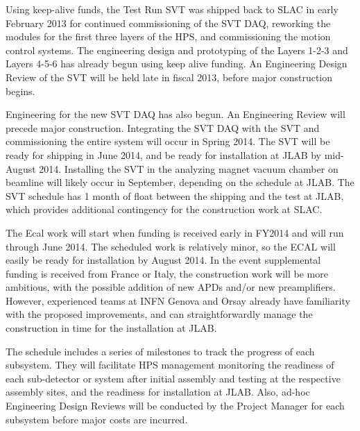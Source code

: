 Using keep-alive funds, the Test Run SVT was shipped back to SLAC in early February 2013 for continued commissioning of the SVT DAQ, reworking the 
modules for the first three layers of the HPS, and commissioning the motion control systems. The engineering design and prototyping of the Layers 1-2-3 and 
Layers 4-5-6 has already begun using keep alive funding. An Engineering Design Review of the SVT will be held late in fiscal 2013, before major construction
begins. 

Engineering for the new SVT DAQ has also begun. An Engineering Review will precede major construction.  Integrating the SVT DAQ with the SVT and commissioning the
entire system will occur in Spring 2014. The SVT will be ready for shipping in June 2014, and be ready for installation at JLAB by mid-August 2014.  Installing 
the SVT in the analyzing magnet vacuum chamber on beamline will likely occur in September, depending on the schedule at JLAB.  The SVT schedule has 1 month of 
float between the shipping and the test at JLAB, which provides additional contingency for the construction work at SLAC.

The Ecal work will start when funding is received early in FY2014 and will run through June 2014. The scheduled work is relatively minor, so the ECAL will 
easily be ready for installation by August 2014. In the event supplemental funding is received from France or Italy, the construction work will be more ambitious, 
with the possible addition of new APDs and/or new preamplifiers. However, experienced teams at INFN Genova and Orsay already have familiarity with the proposed
improvements, and can straightforwardly manage the construction in time for the installation at JLAB.

The schedule includes a series of milestones to track the progress of each subsystem. They  will facilitate HPS management monitoring the readiness of each 
sub-detector or system after initial assembly and testing at the respective assembly sites, and the readiness for installation at JLAB.  Also, ad-hoc 
Engineering Design Reviews will be conducted by the Project Manager for each subsystem before major costs are incurred.


